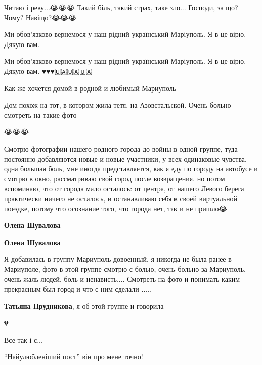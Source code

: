 
Читаю і реву...😭😭😭 Такий біль, такий страх, таке зло... Господи, за що? Чому? Навіщо?😭😭😭


Ми обов'язково вернемося у наш рідний український Маріуполь. Я в це вірю. Дякую вам.


Ми обов'язково вернемося у наш рідний український Маріуполь. Я в це вірю. Дякую вам. ♥️♥️♥️🇺🇦🇺🇦🇺🇦


Как же хочется домой в родной и любимый Мариуполь


Дом похож на тот, в котором жила тетя, на Азовстальской. Очень больно смотреть
на такие фото

😭😭😭


Смотрю фотографии нашего родного города до войны в одной группе, туда постоянно
добавляются новые и новые участники, у всех одинаковые чувства, одна большая
боль, мне иногда представляется, как я еду по городу на автобусе и смотрю в
окно, рассматриваю свой город после возвращения, но потом вспоминаю, что от
города мало осталось: от центра, от нашего Левого берега практически ничего не
осталось, и останавливаю себя в своей виртуальной поездке, потому что осознание
того, что города нет, так и не пришло😭

\begin{itemize} %
\textbf{Олена Шувалова}

\textbf{Олена Шувалова} 

Я добавилась в группу Мариуполь довоенный, я никогда не была ранее в Мариуполе,
фото в этой группе смотрю с болью, очень больно за Мариуполь, очень жаль людей,
боль и ненависть.... Смотреть на фото и понимать каким прекрасным был город и
что с ним сделали .....

\textbf{Татьяна Прудникова}, я об этой группе и говорила
\end{itemize} %

💔


Все так і є...

\enquote{Найулюбленіший пост} він про мене точно!

